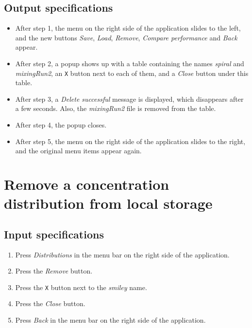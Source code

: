 \subsection*{Output specifications}
\begin{itemize}
\item After step 1, the menu on the right side of the application slides to the left, and the new buttons \emph{Save}, \emph{Load}, \emph{Remove}, \emph{Compare performance} and \emph{Back} appear.
\item After step 2, a popup shows up with a table containing the names \emph{spiral} and \emph{mixingRun2}, an \texttt{X} button next to each of them, and a \emph{Close} button under this table.
\item After step 3, a \emph{Delete successful} message is displayed, which disappears after a few seconds. Also, the \emph{mixingRun2} file is removed from the table.
\item After step 4, the popup closes.
\item After step 5, the menu on the right side of the application slides to the right, and the original menu items appear again.
\end{itemize}

\section{Remove a concentration distribution from local storage}

\subsection*{Input specifications}
\begin{enumerate}
\item Press \emph{Distributions} in the menu bar on the right side of the application.
\item Press the \emph{Remove} button.
\item Press the \texttt{X} button next to the \emph{smiley} name.
\item Press the \emph{Close} button.
\item Press \emph{Back} in the menu bar on the right side of the application.
\end{enumerate}

